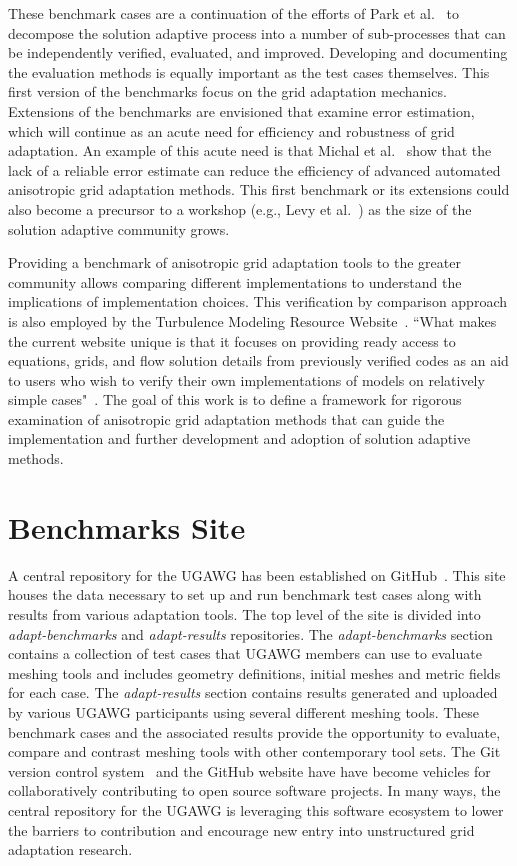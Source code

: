 \documentclass[3p,times,procedia,number]{elsarticle}
\begin{document}
These benchmark cases are a continuation of the efforts of
Park et al.~\cite{park-loseille-krakos-michal-adapt-decomposition}
to decompose the solution adaptive process into a number of
sub-processes that can be independently verified, evaluated, and improved.
Developing and documenting the evaluation methods is equally important
as the test cases themselves.
This first version of the benchmarks focus on the grid adaptation
mechanics.
Extensions of the benchmarks are envisioned that examine error
estimation, which will continue as an acute need for
efficiency and robustness of grid adaptation.
An example of this acute need is that
Michal et al.~\cite{michal-unstruct-adapt-epic-dpw6} show that
the lack of a reliable error estimate can reduce the efficiency of advanced
automated anisotropic grid adaptation methods.
This first benchmark or its extensions could also become a
precursor to a workshop (e.g., Levy et al.~\cite{dpw5-summary})
as the size of the solution adaptive community grows.

Providing a benchmark
of anisotropic grid adaptation tools
to the greater community
allows comparing different implementations
to understand the implications of implementation choices.
This verification by comparison approach is also employed by the
Turbulence Modeling Resource Website~\cite{rumsey-smith-huang-turbmodels-description}.
``What makes the current website unique is that it focuses on
providing ready access to equations, grids, and flow solution details
from previously verified codes as an aid to users
who wish to verify their own implementations of models on
relatively simple cases"~\cite{rumsey-smith-huang-turbmodels-description}.
The goal of this work is to define a framework for
rigorous examination of anisotropic grid adaptation methods
that can guide the implementation and
further development and adoption of solution adaptive methods.

\section{Benchmarks Site}

A central repository for the UGAWG has been established on GitHub~\cite{ugawg-website}.
This site houses the data necessary to set up and run benchmark test cases along with results from various adaptation tools.
The top level of the site is divided into \emph{adapt-benchmarks} and \emph{adapt-results} repositories.
The \emph{adapt-benchmarks} section contains a collection of test cases that UGAWG members can use to evaluate meshing
tools and includes geometry definitions, initial meshes and metric fields for each case.
The \emph{adapt-results} section contains results generated and uploaded by various UGAWG participants using several different meshing tools.
These benchmark cases and the associated results provide the opportunity to evaluate,
compare and contrast meshing tools with other contemporary tool sets.
The Git version control system~\cite{pro-git} and the GitHub website have have become
vehicles for collaboratively contributing to open source software
projects.
In many ways, the central repository for the UGAWG is leveraging
this software ecosystem to lower the barriers to contribution
and encourage new entry into unstructured grid adaptation research.
\end{document}
